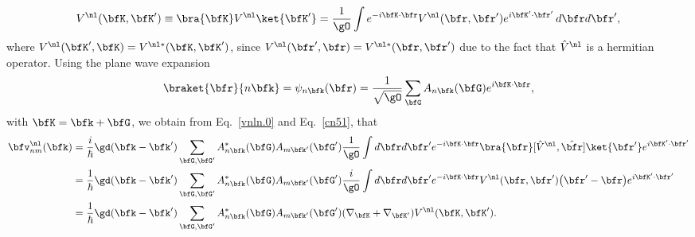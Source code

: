 \begin{align}\label{cn52}
V^\nl(\bfK,\bfK') 
\equiv
\bra{\bfK}
V^\nl
\ket{\bfK'}
=
\frac{1}{\gO}
\int e^{-i\bfK\cdot\bfr}
V^\nl(\bfr,\bfr')
e^{i\bfK'\cdot\bfr'}
\,d\bfr d\bfr'
,
\end{align}
where 
$V^\nl(\bfK',\bfK) =V^{\nl *}(\bfK,\bfK')$, since
$V^\nl(\bfr',\bfr)=V^{\nl*}(\bfr,\bfr')$ due to the fact that $\hat
V^\nl$ is a hermitian operator.
Using the 
plane wave expansion
\begin{align}\label{cn3}
\braket{\bfr}{n\bfk}=\psi_{n\bfk}(\bfr)=\frac{1}{\sqrt{\gO}}
\sum_{\bfG} A_{n\bfk}(\bfG)e^{i\bfK\cdot\bfr}
,
\end{align}
with $\bfK=\bfk+\bfG$, we
obtain from Eq.~\eqref{vnln.0} and Eq.~\eqref{cn51}, that
\begin{align}\label{vnln.2}
\bfv^\nl_{nm}(\bfk)
&=
\frac{i}{\hbar}
\gd(\bfk-\bfk')
\sum_{\bfG,\bfG'}
A^*_{n\bfk}(\bfG) 
A_{m\bfk'}(\bfG')
\frac{1}{\gO}
\int d\bfr d\bfr'
e^{-i\bfK\cdot\bfr}
\bra{\bfr}
[\hat V^\nl,\hat \bfr]
\ket{\bfr'}
e^{i\bfK'\cdot\bfr'}
\nonumber\\
&=
\frac{1}{\hbar}
\gd(\bfk-\bfk')
\sum_{\bfG,\bfG'}
A^*_{n\bfk}(\bfG) 
A_{m\bfk'}(\bfG')
\frac{i}{\gO}
\int d\bfr d\bfr'
e^{-i\bfK\cdot\bfr}
V^\nl(\bfr,\bfr')
\big(\bfr'-\bfr\big)
e^{i\bfK'\cdot\bfr'}
\nonumber\\
&=
\frac{1}{\hbar}
\gd(\bfk-\bfk')
\sum_{\bfG,\bfG'}
A^*_{n\bfk}(\bfG) 
A_{m\bfk'}(\bfG')
(\nabla_\bfK+\nabla_{\bfK'})
V^\nl(\bfK,\bfK')
.
\end{align}  

